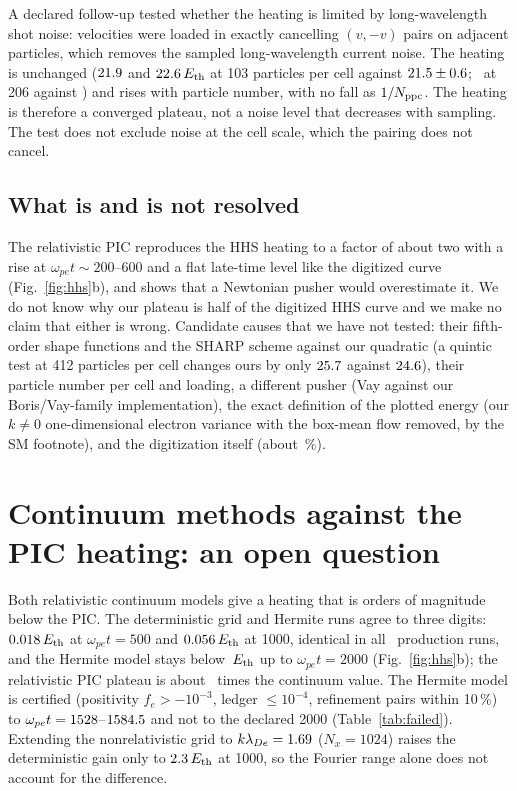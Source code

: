 \documentclass[aps,pre,reprint,floatfix,amsmath,amssymb,nofootinbib,superscriptaddress]{revtex4-2}
\newcommand{\wpe}{\omega_{pe}}
\begin{document}
A declared follow-up tested whether the heating is limited by long-wavelength shot noise: velocities were loaded in exactly cancelling $(v,-v)$ pairs on adjacent particles, which removes the sampled long-wavelength current noise. The heating is unchanged ($21.9$ and $22.6\,E_{\rm th}$ at 103 particles per cell against $21.5\pm0.6$; \mirC\ at 206 against \pcP) and rises with particle number, with no fall as $1/N_{\rm ppc}$. The heating is therefore a converged plateau, not a noise level that decreases with sampling. The test does not exclude noise at the cell scale, which the pairing does not cancel.

\subsection{What is and is not resolved}
The relativistic PIC reproduces the HHS heating to a factor of about two with a rise at $\wpe t\sim200$--600 and a flat late-time level like the digitized curve (Fig.~\ref{fig:hhs}b), and shows that a Newtonian pusher would overestimate it. We do not know why our plateau is half of the digitized HHS curve and we make no claim that either is wrong. Candidate causes that we have not tested: their fifth-order shape functions and the SHARP scheme against our quadratic (a quintic test at 412 particles per cell changes ours by only $25.7$ against $24.6$), their particle number per cell and loading, a different pusher (Vay against our Boris/Vay-family implementation), the exact definition of the plotted energy (our $k\ne0$ one-dimensional electron variance with the box-mean flow removed, by the SM footnote), and the digitization itself (about \hhsDigRel\,\%).

\section{Continuum methods against the PIC heating: an open question}\label{sec:open}
Both relativistic continuum models give a heating that is orders of magnitude below the PIC. The deterministic grid and Hermite runs agree to three digits: $0.018\,E_{\rm th}$ at $\wpe t=500$ and $0.056\,E_{\rm th}$ at 1000, identical in all \herNruns\ production runs, and the Hermite model stays below \herHeatMaxAll\,$E_{\rm th}$ up to $\wpe t=2000$ (Fig.~\ref{fig:hhs}b); the relativistic PIC plateau is about \pcContRatio\ times the continuum value. The Hermite model is certified (positivity $f_e>-10^{-3}$, ledger $\le10^{-4}$, refinement pairs within 10\,\%) to $\wpe t=\fOneLo$--$1584.5$ and not to the declared 2000 (Table~\ref{tab:failed}). Extending the nonrelativistic grid to $k\lambda_{De}=1.69$ ($N_x=1024$) raises the deterministic gain only to $2.3\,E_{\rm th}$ at 1000, so the Fourier range alone does not account for the difference.
\end{document}
